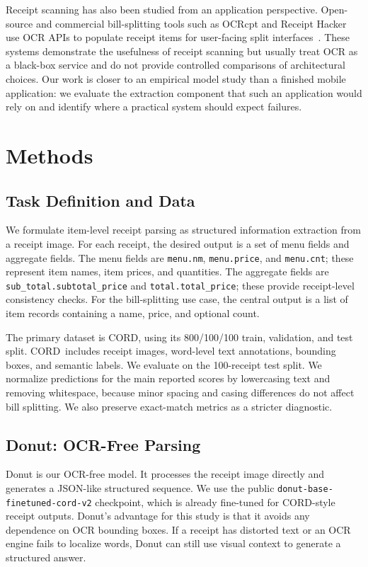\documentclass[9pt,twocolumn,twoside]{extarticle}
\newcommand{\cord}{\textsc{CORD}}
\begin{document}
Receipt scanning has also been studied from an application perspective. Open-source and commercial bill-splitting tools such as OCRcpt and Receipt Hacker use OCR APIs to populate receipt items for user-facing split interfaces~\cite{ocrcpt,receipthacker}. These systems demonstrate the usefulness of receipt scanning but usually treat OCR as a black-box service and do not provide controlled comparisons of architectural choices. Our work is closer to an empirical model study than a finished mobile application: we evaluate the extraction component that such an application would rely on and identify where a practical system should expect failures.

\section{Methods}
\label{sec:methods}

\subsection{Task Definition and Data}
\label{sec:data}

We formulate item-level receipt parsing as structured information extraction from a receipt image. For each receipt, the desired output is a set of menu fields and aggregate fields. The menu fields are \texttt{menu.nm}, \texttt{menu.price}, and \texttt{menu.cnt}; these represent item names, item prices, and quantities. The aggregate fields are \texttt{sub\_total.subtotal\_price} and \texttt{total.total\_price}; these provide receipt-level consistency checks. For the bill-splitting use case, the central output is a list of item records containing a name, price, and optional count.

The primary dataset is \cord, using its 800/100/100 train, validation, and test split. \cord\ includes receipt images, word-level text annotations, bounding boxes, and semantic labels. We evaluate on the 100-receipt test split. We normalize predictions for the main reported scores by lowercasing text and removing whitespace, because minor spacing and casing differences do not affect bill splitting. We also preserve exact-match metrics as a stricter diagnostic.

\subsection{Donut: OCR-Free Parsing}
\label{sec:donut}

Donut is our OCR-free model. It processes the receipt image directly and generates a JSON-like structured sequence. We use the public \texttt{donut-base-finetuned-cord-v2} checkpoint, which is already fine-tuned for \cord-style receipt outputs. Donut's advantage for this study is that it avoids any dependence on OCR bounding boxes. If a receipt has distorted text or an OCR engine fails to localize words, Donut can still use visual context to generate a structured answer.
\end{document}
